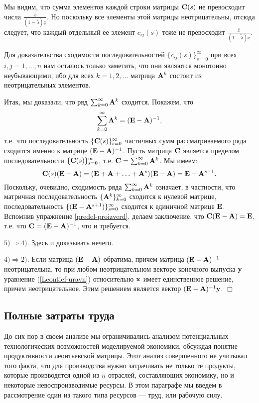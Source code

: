     Мы видим, что сумма элементов каждой строки матрицы $\mathbf{C}(s)$ не
    превосходит числа
    $\frac{\bar{x}}{(1-\tilde{\lambda})\underline{x}}$. Но поскольку
    все элементы этой матрицы неотрицательны, отсюда следует, что
    каждый отдельный ее элемент $c_{ij}(s)$
    тоже не превосходит $\frac{\bar{x}}{(1-\tilde{\lambda})\underline{x}}$.

    Для доказательства сходимости последовательностей
    $\{c_{ij}(s)\}_{s=0}^{\infty}$ при всех $i,j=1,\ldots,n$ нам
    осталось только заметить, что они являются монотонно
    неубывающими, ибо для всех $k=1,2,\ldots$ матрица $\mathbf{A}^{k}$
    состоит из неотрицательных элементов.

    Итак, мы доказали, что ряд $\sum_{k=0}^{\infty}\mathbf{A}^{k}$
    сходится. Покажем, что
    \[\sum_{k=0}^{\infty}\mathbf{A}^{k}=(\mathbf{E}-\mathbf{A})^{-1},\]
    т.е. что последовательность $\{\mathbf{C}(s)\}_{s=0}^{\infty}$ частичных
    сумм рассматриваемого ряда сходится именно к матрице $(\mathbf{E}-\mathbf{A})^{-1}$.
    Пусть матрица $\mathbf{C}$ является пределом последовательности
    $\{\mathbf{C}(s)\}_{s=0}^{\infty}$, т.е. $\mathbf{C}=\sum_{k=0}^{\infty}\mathbf{A}^{k}$.
    Мы имеем:
    \[\mathbf{C}(s)(\mathbf{E}-\mathbf{A})=(\mathbf{E}+\mathbf{A}+\ldots+\mathbf{A}^{s})(\mathbf{E}-\mathbf{A})
    =\mathbf{E}-\mathbf{A}^{s+1}.\]
    Поскольку, очевидно, сходимость ряда
    $\sum_{k=0}^{\infty}\mathbf{A}^{k}$ означает, в частности, что
    матричная последовательность $\{\mathbf{A}^{k}\}_{k=0}^{\infty}$
    сходится к нулевой матрице, последовательность
    $\{(\mathbf{E}-\mathbf{A}^{s+1})\}_{s=0}^{\infty}$ сходится к единичной
    матрице $\mathbf{E}$. Вспомнив упражнение \ref{predel-proizverd}, делаем заключение,
    что $\mathbf{C}(\mathbf{E}-\mathbf{A})=\mathbf{E}$, т.е. что
    $\mathbf{C}=(\mathbf{E}-\mathbf{A})^{-1}$, что и требуется.

    $5)\Rightarrow 4)$. Здесь и доказывать нечего.

    $4)\Rightarrow 2)$. Если матрица $(\mathbf{E}-\mathbf{A})$ обратима,
    причем матрица $(\mathbf{E}-\mathbf{A})^{-1}$ неотрицательна, то при
    любом неотрицательном векторе конечного выпуска $\mathbf{y}$
    уравнение (\ref{Leontief-uravn}) относительно $\mathbf{x}$ имеет
    единственное решение, причем неотрицательное. Этим решением
    является вектор $(\mathbf{E}-\mathbf{A})^{-1}\mathbf{y}$. $\Box$


\subsection{Полные затраты труда}

    До сих пор в своем анализе мы ограничивались анализом
    потенциальных технологических возможностей моделируемой экономики, обсуждая
    понятие продуктивности леонтьевской матрицы. Этот анализ
    совершенного не учитывал того факта, что для производства нужно
    затрачивать не только те продукты, которые производятся одной из
    $n$ отраслей, составляющих экономику, но и некоторые невоспроизводимые ресурсы.
    В этом параграфе мы введем в рассмотрение один из такого типа
    ресурсов --- труд, или рабочую силу.



